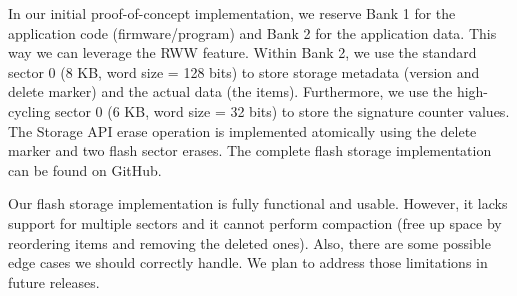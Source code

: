 In our initial proof-of-concept implementation, we reserve Bank 1 for the application code (firmware/program) and Bank 2 for the application data. This way we can leverage the RWW feature. Within Bank 2, we use the standard sector 0 (8 KB, word size = 128 bits) to store storage metadata (version and delete marker) and the actual data (the items). Furthermore, we use the high-cycling sector 0 (6 KB, word size = 32 bits) to store the signature counter values. The Storage API erase operation is implemented atomically using the delete marker and two flash sector erases. The complete flash storage implementation can be found on GitHub.

Our flash storage implementation is {\sbf fully functional and usable}. However, it lacks support for multiple sectors and it cannot perform compaction (free up space by reordering items and removing the deleted ones). Also, there are some possible edge cases we should correctly handle. We plan to address those limitations in future releases.
